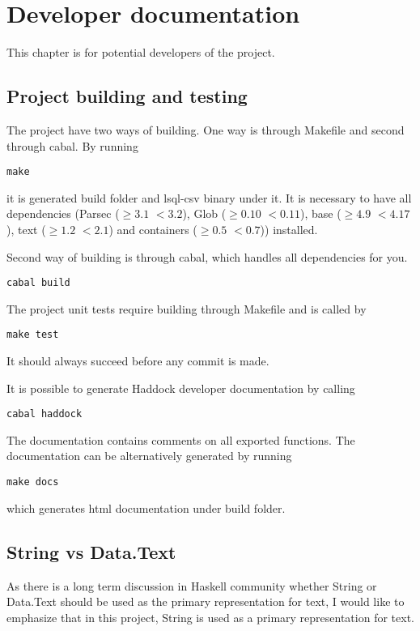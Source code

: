 \chapter{Developer documentation}
This chapter is for potential developers of the project.

\section{Project building and testing}
The project have two ways of building. One way is through Makefile and second through cabal. 
By running 
\begin{verbatim}
make
\end{verbatim}
it is generated build folder and lsql-csv binary under it. 
It is necessary to have all dependencies (Parsec ($\geq 3.1$ $<3.2$), Glob ($\geq 0.10$ $<0.11$), base ($\geq 4.9$ $<4.17$), text ($\geq 1.2$ $<2.1$) and containers ($\geq 0.5$ $<0.7$)) installed.

Second way of building is through cabal, which handles all dependencies for you.

\begin{verbatim}
cabal build
\end{verbatim}


The project unit tests require building through Makefile and is called by
\begin{verbatim}
make test
\end{verbatim}
It should always succeed before any commit is made.

It is possible to generate Haddock developer documentation by calling

\begin{verbatim}
cabal haddock
\end{verbatim}

The documentation contains comments on all exported functions. The documentation can be alternatively generated
by running

\begin{verbatim}
make docs
\end{verbatim}
which generates html documentation under build folder.

\section{String vs Data.Text}
As there is a long term discussion in Haskell community whether String or Data.Text should be used as the 
primary representation for text, I would like to emphasize that in this project, String is used as a primary
representation for text.

